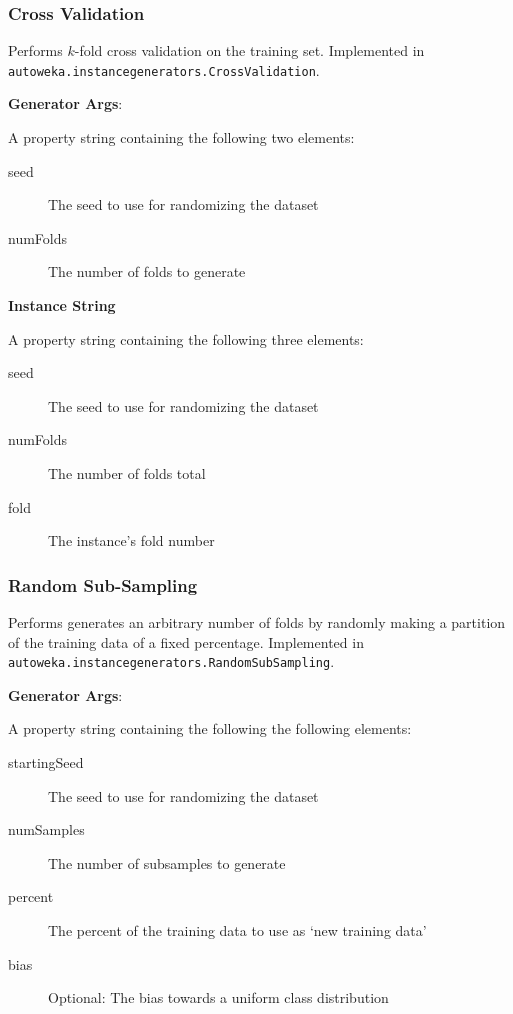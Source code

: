 \subsubsection{Cross Validation}

Performs $k$-fold cross validation on the training set. Implemented in \\ \texttt{autoweka.instancegenerators.CrossValidation}. 

\textbf{Generator Args}:
\begin{tabover}
A property string containing the following two elements:
\begin{description}
 \item [seed] The seed to use for randomizing the dataset
 \item [numFolds] The number of folds to generate
\end{description}
\end{tabover}

\textbf{Instance String}
\begin{tabover}
A property string containing the following three elements:
\begin{description}
 \item [seed] The seed to use for randomizing the dataset
 \item [numFolds] The number of folds total
 \item [fold] The instance's fold number
\end{description}
\end{tabover}


\subsubsection{Random Sub-Sampling}

Performs generates an arbitrary number of folds by randomly making a partition of the training data of a fixed percentage. Implemented in \texttt{autoweka.instancegenerators.RandomSubSampling}. 

\textbf{Generator Args}:
\begin{tabover}
A property string containing the following the following elements:
\begin{description}
 \item [startingSeed] The seed to use for randomizing the dataset
 \item [numSamples] The number of subsamples to generate
 \item [percent] The percent of the training data to use as `new training data'
 \item [bias] Optional: The bias towards a uniform class distribution
\end{description}
\end{tabover}


